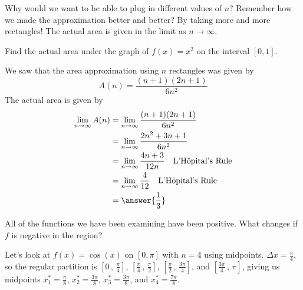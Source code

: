 \documentclass{ximera}
\begin{document}
Why would we want to be able to plug in different values of $n$?  Remember how we made the approximation better and better?  By taking
more and more rectangles!  The actual area is given in the limit as $n\to \infty$.

\begin{example}
	Find the actual area under the graph of $f(x)=x^2$ on the interval $[0,1]$.
	\begin{explanation}
		We saw that the area approximation using $n$ rectangles was given by
		\[ A(n) = \frac{(n+1)(2n+1)}{6n^2} \]
		The actual area is given by
		\begin{align*}
			\lim_{n\to\infty} A(n) &= \lim_{n\to\infty} \frac{(n+1)(2n+1)}{6n^2}\\
				&= \lim_{n\to\infty} \frac{2n^2+3n+1}{6n^2} \\
				&= \lim_{n\to\infty} \frac{4n+3}{12n} \quad \text{L'H\^opital's Rule}\\
				&= \lim_{n\to\infty} \frac{4}{12} \quad \text{L'H\^opital's Rule}\\
				&= \answer{\frac{1}{3}}
		\end{align*}
	\end{explanation}
\end{example}

All of the functions we have been examining have been positive.  What changes if $f$ is negative in the region?

Let's look at $f(x) = \cos(x)$ on $[0, \pi]$ with $n=4$ using midpoints.
$\Delta x = \frac{\pi}{4}$, so the regular partition is $\left[ 0 \, , \, \frac{\pi}{4} \right]$, $\left[ \frac{\pi}{4} \, , \, \frac{\pi}{2} \right]$, $\left[ \frac{\pi}{2} \, , \, \frac{3\pi}{4} \right]$, and 
$\left[ \frac{3\pi}{4} \, , \, \pi \right]$, giving us midpoints $x_1^* = \frac{\pi}{8}$, $x_2^* = \frac{3\pi}{8}$, $x_3^* = \frac{3\pi}{8}$, and $x_4^*=\frac{7\pi}{8}$.
\begin{image}
\end{image}
\end{document}
